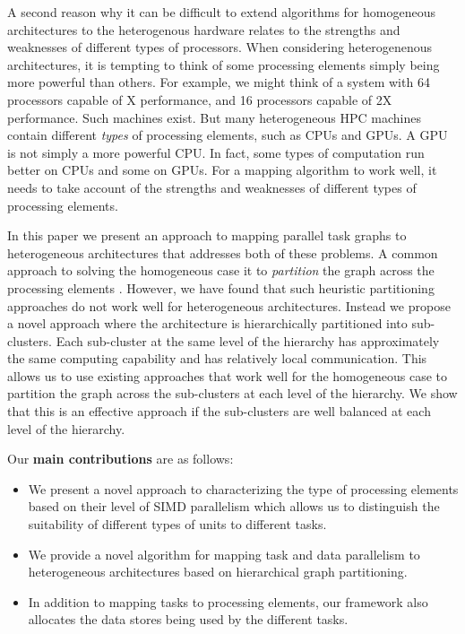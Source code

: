 A second reason why it can be difficult to extend algorithms for
homogeneous architectures to the heterogenous hardware relates to the
strengths and weaknesses of different types of processors. When
considering heterogenenous architectures, it is tempting to think of
some processing elements simply being more powerful than others. For
example, we might think of a system with 64 processors capable of X
performance, and 16 processors capable of 2X performance. Such machines
exist. But many heterogeneous HPC machines contain different
\textit{types} of processing elements, such as CPUs and GPUs. A GPU is
not simply a more powerful CPU. In fact, some types of computation run
better on CPUs and some on GPUs.  For a mapping algorithm to work well,
it needs to take account of the strengths and weaknesses of different
types of processing elements.

In this paper we present an approach to mapping parallel task graphs to
heterogeneous architectures that addresses both of these problems.  A
common approach to solving the homogeneous case it to \textit{partition}
the graph across the processing elements%
. However, we have found that such heuristic partitioning approaches do
not work well for heterogeneous architectures. Instead we propose a
novel approach where the architecture is hierarchically partitioned into
sub-clusters.  Each sub-cluster at the same level of the hierarchy has
approximately the same computing capability and has relatively local
communication.  This allows us to use existing approaches that work well
for the homogeneous case to partition the graph across the sub-clusters
at each level of the hierarchy. We show that this is an effective
approach if the sub-clusters are well balanced at each level of the
hierarchy.

Our \textbf{main contributions} are as follows:
\begin{itemize}
\item We present a novel approach to characterizing the type of
  processing elements based on their level of SIMD parallelism which
  allows us to distinguish the suitability of different types of units
  to different tasks.
\item We provide a novel algorithm for mapping task and data parallelism
  to heterogeneous architectures based on hierarchical graph
  partitioning.
\item In addition to mapping tasks to processing elements, our framework
  also allocates the data stores being used by the different tasks.
\end{itemize}

